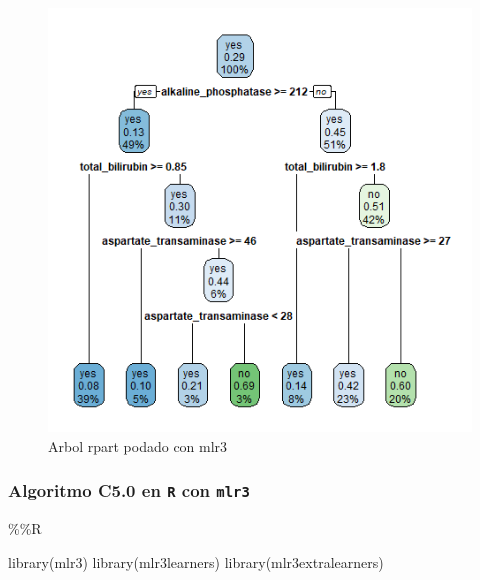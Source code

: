 \documentclass[
  11pt,
  a4paper,
]{article}
\newenvironment{Shaded}{\begin{snugshade}}{\end{snugshade}}
\newcommand{\FunctionTok}[1]{\textcolor[rgb]{0.00,0.00,0.00}{#1}}
\newcommand{\NormalTok}[1]{#1}
\newcommand{\SpecialCharTok}[1]{\textcolor[rgb]{0.00,0.00,0.00}{#1}}
\begin{document}
\newpage

\begin{Shaded}
\end{Shaded}

\begin{figure}
\centering
\includegraphics{output_342_0.png}
\caption{Arbol rpart podado con mlr3}
\end{figure}

\newpage

\hypertarget{algoritmo-c5.0-en-r-con-mlr3}{%
\subsubsection{\texorpdfstring{Algoritmo C5.0 en \texttt{R} con
\texttt{mlr3}
}{Algoritmo C5.0 en R con mlr3 }}\label{algoritmo-c5.0-en-r-con-mlr3}}

\begin{Shaded}
\begin{Highlighting}[]
\SpecialCharTok{\%\%}\NormalTok{R}

\FunctionTok{library}\NormalTok{(mlr3)}
\FunctionTok{library}\NormalTok{(mlr3learners)}
\FunctionTok{library}\NormalTok{(mlr3extralearners)}
\end{Highlighting}
\end{Shaded}
\end{document}
